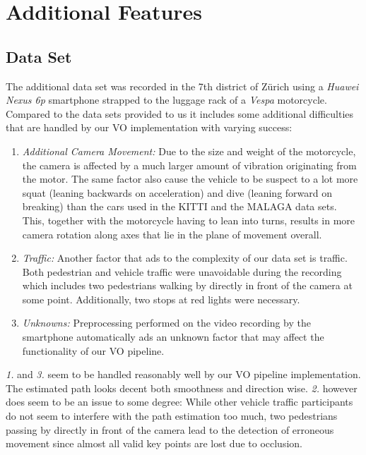 \chapter{Additional Features}
\section{Data Set}
\label{dataset}

The additional data set was recorded in the 7th district of Zürich using a \emph{Huawei Nexus 6p} smartphone strapped to the luggage rack of a \emph{Vespa} motorcycle. Compared to the data sets provided to us it includes some additional difficulties that are handled by our VO implementation with varying success:\\

\begin{enumerate}
\item \emph{Additional Camera Movement:} Due to the size and weight of the motorcycle, the camera is affected by a much larger amount of vibration originating from the motor. The same factor also cause the vehicle to be suspect to a lot more squat (leaning backwards on acceleration) and dive (leaning forward on breaking) than the cars used in the KITTI and the MALAGA data sets. This, together with the motorcycle having to lean into turns, results in more camera rotation along axes that lie in the plane of movement overall.

\item \emph{Traffic:} Another factor that ads to the complexity of our data set is traffic. Both pedestrian and vehicle traffic were unavoidable during the recording which includes two pedestrians walking by directly in front of the camera at some point. Additionally, two stops at red lights were necessary.

\item \emph{Unknowns:} Preprocessing performed on the video recording by the smartphone automatically ads an unknown factor that may affect the functionality of our VO pipeline.
\end{enumerate}

\emph{1.} and \emph{3.} seem to be handled reasonably well by our VO pipeline implementation. The estimated path looks decent both smoothness and direction wise. \emph{2.} however does seem to be an issue to some degree: While other vehicle traffic participants do not seem to interfere with the path estimation too much, two pedestrians passing by directly in front of the camera lead to the detection of erroneous movement since almost all valid key points are lost due to occlusion.


